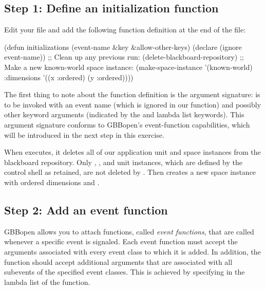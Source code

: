 \documentclass[10pt,twoside,english,pdftex]{article}
\begin{document}
\subsection*{Step 1: Define an initialization function}

Edit your  file and add the following function
definition at the end of the file:
%
\W\supp
\begin{example}
  (defun initializations (event-name &key &allow-other-keys)
    (declare (ignore event-name))
    ;; Clean up any previous run:
    (delete-blackboard-repository)
    ;; Make a new known-world space instance:
    (make-space-instance 
     '(known-world)
     :dimensions '((x :ordered) (y :ordered))))
\end{example}

The first thing to note about the function definition is the argument
signature:  is to be invoked with an event name (which
is ignored in our function) and possibly other keyword arguments (indicated by
the  and  lambda list keywords).  This
argument signature conforms to GBBopen's event-function capabilities, which
will be introduced in the next step in this exercise.

When  executes, it deletes all of our application unit
and space instances from the blackboard repository.  Only ,
, and  unit instances, which are
defined by the control shell as retained, are not deleted by
.  Then  creates a
new  space instance with ordered dimensions  and
.

\subsection*{Step 2: Add an event function}

GBBopen allows you to attach functions, called \textit{event
  functions}, that are called whenever a specific event is signaled.
Each event function must accept the arguments associated with every
event class to which it is added. In addition, the function should
accept additional arguments that are associated with all subevents of
the specified event classes. This is achieved by specifying
 in the lambda list of the function.
\end{document}
